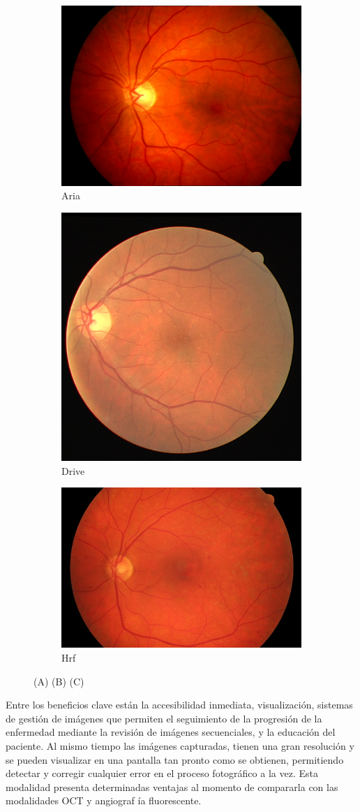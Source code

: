 \begin{figure}[H]
    \centering
    \begin{subfigure}[b]{0.3\textwidth}
				\centering
        \includegraphics[height=3cm\textwidth]{./Figures/imagesARIA.png}
        \caption{Aria}
        \label{fig:Aria}
    \end{subfigure}
    \begin{subfigure}[b]{0.3\textwidth}
				\centering
        \includegraphics[height=3cm\textwidth]{./Figures/imagesDRIVE.png}
        \caption{Drive}
        \label{fig:Drive}
    \end{subfigure}
    \begin{subfigure}[b]{0.3\textwidth}
				\centering
        \includegraphics[height=3cm\textwidth]{./Figures/imagesHRF.png}
        \caption{Hrf}
        \label{fig:Hrf}
    \end{subfigure}        
    \label{fig:Imagenes de fondo de ojo}
    \caption{(A) (B) (C)}
\end{figure}
Entre los beneficios clave est\'an la accesibilidad inmediata, visualizaci\'on, sistemas de gesti\'on de im\'agenes que permiten el seguimiento de la progresi\'on de la enfermedad mediante la revisi\'on de im\'agenes secuenciales, y la educaci\'on del paciente. Al mismo tiempo las im\'agenes capturadas, tienen una  gran resoluci\'on y se pueden visualizar en una pantalla tan pronto como se obtienen, permitiendo detectar y corregir cualquier error en el proceso fotogr\'afico a la vez. \cite{cunha2004blood}
Esta modalidad presenta determinadas ventajas al momento de compararla con las modalidades OCT y angiograf \'ia fluorescente. 

